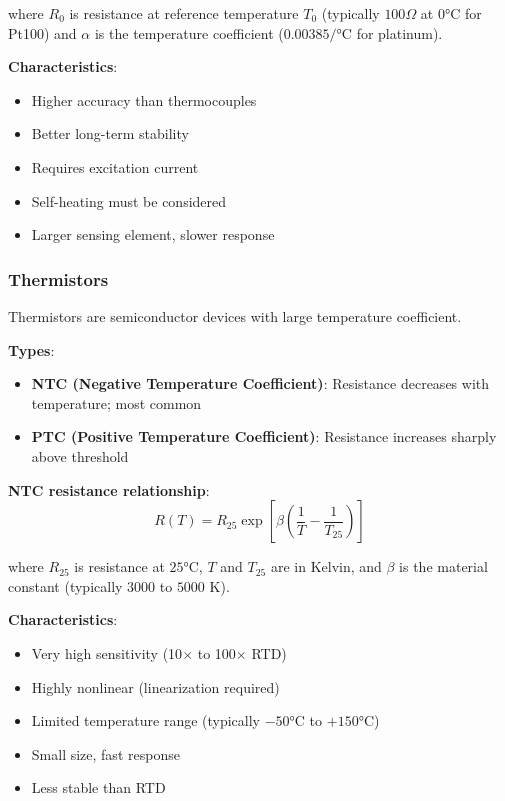 where $R_0$ is resistance at reference temperature $T_0$ (typically $100\Omega$ at $0°\text{C}$ for Pt100) and $\alpha$ is the temperature coefficient ($0.00385/°\text{C}$ for platinum).

\textbf{Characteristics}:
\begin{itemize}
    \item Higher accuracy than thermocouples
    \item Better long-term stability
    \item Requires excitation current
    \item Self-heating must be considered
    \item Larger sensing element, slower response
\end{itemize}

\subsubsection{Thermistors}

Thermistors are semiconductor devices with large temperature coefficient.

\textbf{Types}:
\begin{itemize}
    \item \textbf{NTC (Negative Temperature Coefficient)}: Resistance decreases with temperature; most common
    \item \textbf{PTC (Positive Temperature Coefficient)}: Resistance increases sharply above threshold
\end{itemize}

\textbf{NTC resistance relationship}:
\begin{equation}
R(T) = R_{25} \exp\left[\beta\left(\frac{1}{T} - \frac{1}{T_{25}}\right)\right]
\label{eq:thermistor}
\end{equation}

where $R_{25}$ is resistance at $25°\text{C}$, $T$ and $T_{25}$ are in Kelvin, and $\beta$ is the material constant (typically $3000$ to $5000\text{ K}$).

\textbf{Characteristics}:
\begin{itemize}
    \item Very high sensitivity (10$\times$ to 100$\times$ RTD)
    \item Highly nonlinear (linearization required)
    \item Limited temperature range (typically $-50°\text{C}$ to $+150°\text{C}$)
    \item Small size, fast response
    \item Less stable than RTD
\end{itemize}

